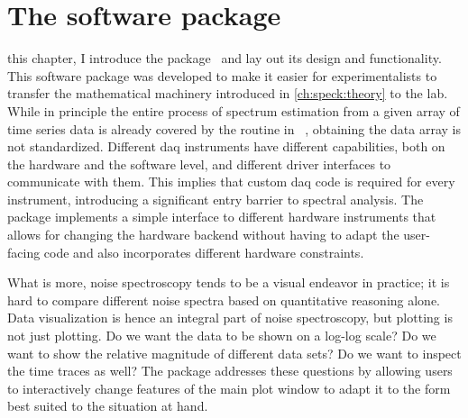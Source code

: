 \chapter{The \pyspeck software package}\label{ch:speck:software}
 this chapter, I introduce the \pyspeck \python package~\cite{Hangleiter_pyspeck}
and lay out its design and functionality.
This software package was developed to make it easier for experimentalists to transfer the mathematical machinery introduced in \cref{ch:speck:theory} to the lab.
While in principle the entire process of spectrum estimation from a given array of time series data is already covered by the  routine in \scipy~\cite{WelchScipy}, obtaining the data array is not standardized.
Different \gls{daq} instruments have different capabilities, both on the hardware and the software level, and different driver interfaces to communicate with them.
This implies that custom \acrlong{daq} code is required for every instrument, introducing a significant entry barrier to spectral analysis.
The \pyspeck package implements a simple interface to different hardware instruments that allows for changing the hardware backend without having to adapt the user-facing code and also incorporates different hardware constraints.

What is more, noise spectroscopy tends to be a visual endeavor in practice; it is hard to compare different noise spectra based on quantitative reasoning alone.
Data visualization is hence an integral part of noise spectroscopy, but plotting is not just plotting.
Do we want the data to be shown on a log-log scale?
Do we want to show the relative magnitude of different data sets?
Do we want to inspect the time traces as well?
The \pyspeck package addresses these questions by allowing users to interactively change features of the main plot window to adapt it to the form best suited to the situation at hand.

